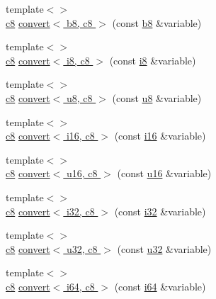 \begin{DoxyCompactItemize}
\item 
{\footnotesize template$<$$>$ }\\\hyperlink{types_8h_aa1ba8aac9fcd831012308297336ac74b}{c8} \hyperlink{namespacecrap_a95efc48c23b260344ec52905a6271a20}{convert$<$ b8, c8 $>$} (const \hyperlink{types_8h_a74eb47b4ab9e428eab7b91b3b877fa6c}{b8} \&variable)
\item 
{\footnotesize template$<$$>$ }\\\hyperlink{types_8h_aa1ba8aac9fcd831012308297336ac74b}{c8} \hyperlink{namespacecrap_a73d7643626ceb0e0c894f1e299cb8459}{convert$<$ i8, c8 $>$} (const \hyperlink{types_8h_ae3702327b5f47e83b431e22b33da7b58}{i8} \&variable)
\item 
{\footnotesize template$<$$>$ }\\\hyperlink{types_8h_aa1ba8aac9fcd831012308297336ac74b}{c8} \hyperlink{namespacecrap_aaf0bb29d3f5e8b47e8665f5d8d35791b}{convert$<$ u8, c8 $>$} (const \hyperlink{types_8h_a92c50087ca0e64fa93fc59402c55f8ca}{u8} \&variable)
\item 
{\footnotesize template$<$$>$ }\\\hyperlink{types_8h_aa1ba8aac9fcd831012308297336ac74b}{c8} \hyperlink{namespacecrap_a63949155837aebbd3d36c688ec07013e}{convert$<$ i16, c8 $>$} (const \hyperlink{types_8h_ad309dbcaeea13aa602d686964156ea0b}{i16} \&variable)
\item 
{\footnotesize template$<$$>$ }\\\hyperlink{types_8h_aa1ba8aac9fcd831012308297336ac74b}{c8} \hyperlink{namespacecrap_a748377a39febc32c7435fc9b9c39b5a0}{convert$<$ u16, c8 $>$} (const \hyperlink{types_8h_ace9d960e74685e2cd84b36132dbbf8aa}{u16} \&variable)
\item 
{\footnotesize template$<$$>$ }\\\hyperlink{types_8h_aa1ba8aac9fcd831012308297336ac74b}{c8} \hyperlink{namespacecrap_a31cfda5ecf70b22cc349697c0c7f7178}{convert$<$ i32, c8 $>$} (const \hyperlink{types_8h_a48d6cd8e4135fb2ff7e7f2dac84089ec}{i32} \&variable)
\item 
{\footnotesize template$<$$>$ }\\\hyperlink{types_8h_aa1ba8aac9fcd831012308297336ac74b}{c8} \hyperlink{namespacecrap_a1e7ab3c65075a14227f2ab643713084f}{convert$<$ u32, c8 $>$} (const \hyperlink{types_8h_afaa62991928fb9fb18ff0db62a040aba}{u32} \&variable)
\item 
{\footnotesize template$<$$>$ }\\\hyperlink{types_8h_aa1ba8aac9fcd831012308297336ac74b}{c8} \hyperlink{namespacecrap_a26c8e2873c72049ab323c828192544b8}{convert$<$ i64, c8 $>$} (const \hyperlink{types_8h_a85cb35fbe5bf2961d7ad5f26814a91a2}{i64} \&variable)

\end{DoxyCompactItemize}
